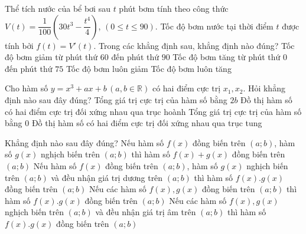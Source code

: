\begin{ex}%
Thể tích nước của bể bơi sau $t$ phút bơm tính theo công thức $V(t)=\dfrac{1}{100}\left(30t^3-\dfrac{t^4}{4}\right)$, $(0\leq t\leq 90)$. Tốc độ bơm nước tại thời điểm $t$ được tính bởi $f(t)=V'(t)$. Trong các khẳng định sau, khẳng định nào đúng?
\choice
{\True Tốc độ bơm giảm từ phút thứ $60$ đến phút thứ $90$}
{Tốc độ bơm tăng từ phút thứ $0$ đến phút thứ $75$}
{Tốc độ bơm luôn giảm}
{Tốc độ bơm luôn tăng}
\end{ex} 

\begin{ex}%
Cho hàm số $y=x^3+ax+b\, (a,b\in \mathbb{R})$ có hai điểm cực trị $x_1, x_2$. Hỏi khẳng định nào sau đây đúng?
\choice
{\True Tổng giá trị cực trị của hàm số bằng $2b$}
{Đồ thị hàm số có hai điểm cực trị đối xứng nhau qua trục hoành}
{Tổng giá trị cực trị của hàm số bằng $0$}
{Đồ thị hàm số có hai điểm cực trị đối xứng nhau qua trục tung}
\end{ex} 

\begin{ex}%
Khẳng định nào sau đây đúng?
\choice
{Nếu hàm số $f(x)$ đồng biến trên $(a;b)$, hàm số $g(x)$ nghịch biến trên $(a;b)$ thì hàm số $f(x)+g(x)$ đồng biến trên $(a;b)$}
{Nếu hàm số $f(x)$ đồng biến trên $(a;b)$, hàm số $g(x)$ nghịch biến trên $(a;b)$ và đều nhận giá trị dương trên $(a;b)$ thì hàm số $f(x).g(x)$ đồng biến trên $(a;b)$}
{Nếu các hàm số $f(x), g(x)$ đồng biến trên $(a;b)$ thì hàm số $f(x).g(x)$ đồng biến trên $(a;b)$}
{\True Nếu các hàm số $f(x), g(x)$ nghịch biến trên $(a;b)$ và đều nhận giá trị âm trên $(a;b)$ thì hàm số $f(x).g(x)$ đồng biến trên $(a;b)$}
\end{ex} 

